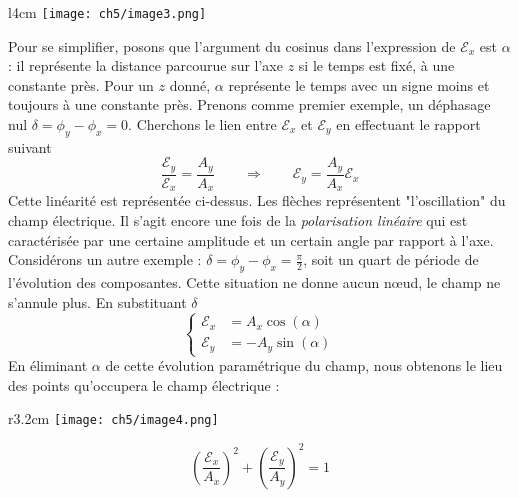 	\begin{wrapfigure}[9]{l}{4cm}
	\vspace{-5mm}
	\texttt{[image: ch5/image3.png]}
	\end{wrapfigure}	
	Pour se simplifier, posons que l'argument du cosinus dans l'expression de $\mathcal{E}_x$ est 
	$\alpha$ : il représente la distance parcourue sur l'axe $z$ si le temps est fixé, à une 
	constante près. Pour un $z$ donné, $\alpha$ représente le temps avec un signe moins et toujours 
	à une constante près. Prenons comme premier exemple, un déphasage nul $\delta = \phi_y-\phi_x=0$.
	Cherchons le lien entre $\mathcal{E}_x$ et $\mathcal{E}_y$ en effectuant le rapport suivant
	\begin{equation}
	\dfrac{\mathcal{E}_y}{\mathcal{E}_x} = \dfrac{A_y}{A_x}\qquad\Rightarrow\qquad \mathcal{E}_y = 
	\dfrac{A_y}{A_x}\mathcal{E}_x
	\end{equation}
	Cette linéarité est représentée ci-dessus. Les flèches représentent "l'oscillation" du champ 
	électrique. Il s'agit encore une fois de la \textit{polarisation linéaire} qui est caractérisée 
	par une certaine amplitude et un certain angle par rapport à l'axe.\\
	
	Considérons un autre exemple : $\delta=\phi_y-\phi_x=\frac{\pi}{2}$, soit un quart de période 
	de l'évolution des composantes. Cette situation ne donne aucun nœud, le champ ne s'annule plus.
	En substituant $\delta$
	\begin{equation}
	\left\{\begin{array}{ll}
	\mathcal{E}_x &= A_x\cos(\alpha)\\
	\mathcal{E}_y &= -A_y\sin(\alpha)
	\end{array}\right.
	\end{equation}
	En éliminant $\alpha$ de cette évolution paramétrique du champ, nous obtenons le lieu des points 
	qu'occupera le champ électrique :
	
 	\begin{wrapfigure}[5]{r}{3.2cm}
	\vspace{-5mm}
	\texttt{[image: ch5/image4.png]}
	\end{wrapfigure}	
	\begin{equation}
	\left(\frac{\mathcal{E}_x}{A_x}\right)^2+\left(\frac{\mathcal{E}_y}{A_y}\right)^2 = 1
	\end{equation}
	
